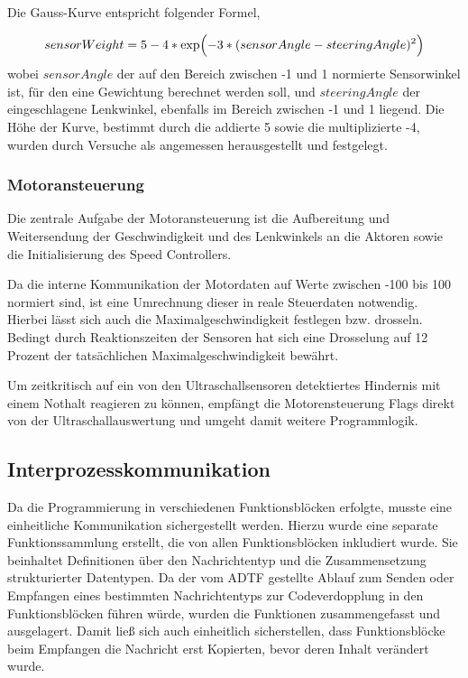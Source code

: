 \documentclass[12pt, a4paper]{scrartcl}
\begin{document}
Die Gauss-Kurve entspricht folgender Formel,

\begin{equation}\label{eq:gaussian-weighted-dist}
sensorWeight= 5 - 4 * \exp\Bigl({-3 * (sensorAngle - steeringAngle)^2}\Bigr)
\end{equation}
wobei $sensorAngle$ der auf den Bereich zwischen -1 und 1 normierte Sensorwinkel ist, für den eine Gewichtung berechnet werden soll, und $steeringAngle$ der eingeschlagene Lenkwinkel, ebenfalls im Bereich zwischen -1 und 1 liegend. Die Höhe der Kurve, bestimmt durch die addierte 5 sowie die multiplizierte -4, wurden durch Versuche als angemessen herausgestellt und festgelegt.

\clearpage

\subsubsection{Motoransteuerung}
Die zentrale Aufgabe der Motoransteuerung ist die Aufbereitung und Weitersendung der Geschwindigkeit und des Lenkwinkels an die Aktoren sowie die Initialisierung des Speed Controllers.

Da die interne Kommunikation der Motordaten auf Werte zwischen -100 bis 100 normiert sind, ist eine Umrechnung dieser in reale Steuerdaten notwendig. Hierbei lässt sich auch die Maximalgeschwindigkeit festlegen bzw. drosseln. Bedingt durch Reaktionszeiten der Sensoren hat sich eine Drosselung auf 12 Prozent der tatsächlichen Maximalgeschwindigkeit bewährt.

Um zeitkritisch auf ein von den Ultraschallsensoren detektiertes Hindernis mit einem Nothalt reagieren zu können, empfängt die Motorensteuerung Flags direkt von der Ultraschallauswertung und umgeht damit weitere Programmlogik.
   

\subsection{Interprozesskommunikation}

Da die Programmierung in verschiedenen Funktionsblöcken erfolgte, musste eine einheitliche Kommunikation sichergestellt werden. Hierzu wurde eine separate Funktionssammlung erstellt, die von allen Funktionsblöcken inkludiert wurde. Sie beinhaltet Definitionen über den Nachrichtentyp und die Zusammensetzung strukturierter Datentypen. Da der vom ADTF gestellte Ablauf zum Senden oder Empfangen eines bestimmten Nachrichtentyps zur Codeverdopplung in den Funktionsblöcken führen würde, wurden die Funktionen zusammengefasst und ausgelagert. Damit ließ sich auch einheitlich sicherstellen, dass Funktionsblöcke beim Empfangen die Nachricht erst Kopierten, bevor deren Inhalt verändert wurde.
\end{document}
